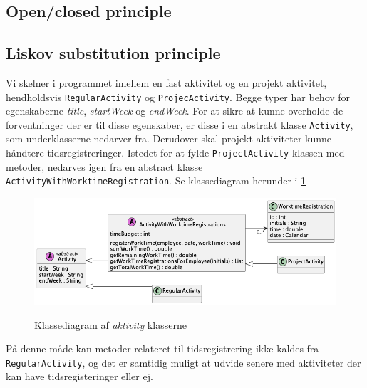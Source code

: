 \subsection{Open/closed principle} \label{sec:solid_o}


\subsection{Liskov substitution principle} \label{sec:solid_l}
Vi skelner i programmet imellem en fast aktivitet og en projekt aktivitet, hendholdsvis \texttt{RegularActivity} og \texttt{ProjecActivity}. Begge typer har behov for egenskaberne \textit{title}, \textit{startWeek} og \textit{endWeek}. For at sikre at kunne overholde de forventninger der er til disse egenskaber, er disse i en abstrakt klasse \texttt{Activity}, som underklasserne nedarver fra. Derudover skal projekt aktiviteter kunne håndtere tidsregistreringer. Istedet for at fylde \texttt{ProjectActivity}-klassen med metoder, nedarves igen fra en abstract klasse \texttt{ActivityWithWorktimeRegistration}. Se klassediagram herunder i \ref{fig:class_activity_example} 
\begin{figure}[H]
    \centering
    \caption{Klassediagram af \textit{aktivity} klasserne}
    \includegraphics[width = \textwidth, keepaspectratio]{TaskFusion/out/assets/diagrams/class_liskov_model_example/liskov_model_example.png}
    \label{fig:class_activity_example}
\end{figure}
På denne måde kan metoder relateret til tidsregistrering ikke kaldes fra \texttt{RegularActivity}, og det er samtidig muligt at udvide senere med aktiviteter der kan have tidsregisteringer eller ej.


